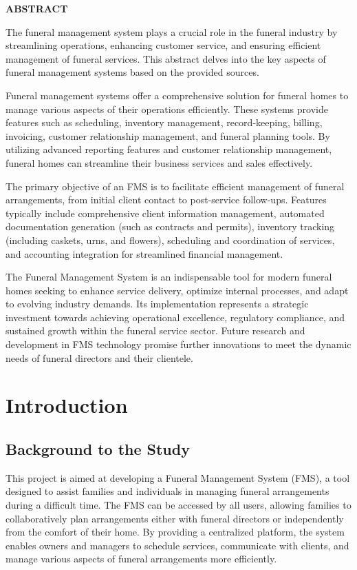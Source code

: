 \documentclass[a4paper,12pt]{report}
\begin{document}
\begin{center}
    {\LARGE \textbf{ABSTRACT}}
\end{center}

\vspace{1cm}

The funeral management system plays a crucial role in the funeral industry by streamlining operations, enhancing customer service, and ensuring efficient management of funeral services. This abstract delves into the key aspects of funeral management systems based on the provided sources.

Funeral management systems offer a comprehensive solution for funeral homes to manage various aspects of their operations efficiently. These systems provide features such as scheduling, inventory management, record-keeping, billing, invoicing, customer relationship management, and funeral planning tools. By utilizing advanced reporting features and customer relationship management, funeral homes can streamline their business services and sales effectively.

The primary objective of an FMS is to facilitate efficient management of funeral arrangements, from initial client contact to post-service follow-ups. Features typically include comprehensive client information management, automated documentation generation (such as contracts and permits), inventory tracking (including caskets, urns, and flowers), scheduling and coordination of services, and accounting integration for streamlined financial management.

The Funeral Management System is an indispensable tool for modern funeral homes seeking to enhance service delivery, optimize internal processes, and adapt to evolving industry demands. Its implementation represents a strategic investment towards achieving operational excellence, regulatory compliance, and sustained growth within the funeral service sector. Future research and development in FMS technology promise further innovations to meet the dynamic needs of funeral directors and their clientele.

\vfill
\newpage

\newpage
\chapter{Introduction}

\section{Background to the Study}
This project is aimed at developing a Funeral Management System (FMS), a tool designed to assist families and individuals in managing funeral arrangements during a difficult time. The FMS can be accessed by all users, allowing families to collaboratively plan arrangements either with funeral directors or independently from the comfort of their home. By providing a centralized platform, the system enables owners and managers to schedule services, communicate with clients, and manage various aspects of funeral arrangements more efficiently.
\end{document}
